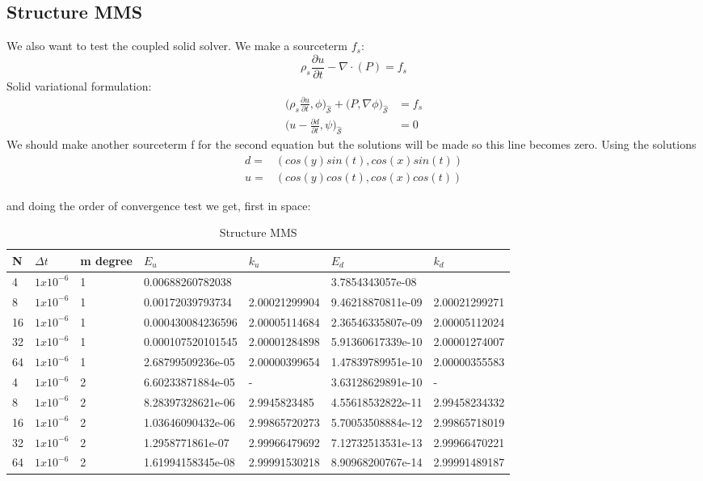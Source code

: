 \subsection{Structure MMS}
We also want to test the coupled solid solver. We make a sourceterm $f_s$:
$$\rho_s \frac{\partial u}{\partial t} - \nabla \cdot ( P ) = f_s $$
Solid variational formulation:
\begin{align}
\big(\rho_s \frac{\partial u}{\partial t},\phi \big)_{\mathcal{\hat{S}}} + \big(P, \nabla \phi \big)_{\mathcal{\hat{S}}} &=f_s \\
\big( u- \frac{\partial d}{\partial t} ,\psi \big)_{\mathcal{\hat{S}}} &= 0 
\end{align}
We should make another sourceterm f for the second equation but the solutions will be made so this line becomes zero.
Using the solutions 
\begin{align*}
d =& ( cos(y)sin(t) , cos(x)sin(t) )\\
u =& ( cos(y)cos(t), cos(x)cos(t) )
\end{align*}



and doing the order of convergence test we get, first in space:

\begin{table}[h!]
\centering
\caption{Structure MMS}
\label{my-label}
\begin{tabular}{|l|l|l|l|l|l|l|}
\hline
N & $\Delta t$ & m degree & $E_u$ & $k_u$ & $E_d$ & $k_d$ \\ \hline
4 & $1x10^{-6}$ & 1 & 0.00688260782038 &  & 3.7854343057e-08 &  \\ \hline
8 & $1x10^{-6}$ & 1 & 0.00172039793734 & 2.00021299904 & 9.46218870811e-09 & 2.00021299271 \\ \hline
16 & $1x10^{-6}$ & 1 & 0.000430084236596 & 2.00005114684 & 2.36546335807e-09 & 2.00005112024 \\ \hline
32 & $1x10^{-6}$ & 1 & 0.000107520101545 & 2.00001284898 & 5.91360617339e-10 & 2.00001274007 \\ \hline
64 & $1x10^{-6}$ & 1 & 2.68799509236e-05 & 2.00000399654 & 1.47839789951e-10 & 2.00000355583 \\ \hline
4 & $1x10^{-6}$ & 2 & 6.60233871884e-05 & - & 3.63128629891e-10 & - \\ \hline
8 & $1x10^{-6}$ & 2 & 8.28397328621e-06 & 2.9945823485 & 4.55618532822e-11 & 2.99458234332 \\ \hline
16 & $1x10^{-6}$ & 2 & 1.03646090432e-06 & 2.99865720273 & 5.70053508884e-12 & 2.99865718019 \\ \hline
32 & $1x10^{-6}$ & 2 & 1.2958771861e-07 & 2.99966479692 & 7.12732513531e-13 & 2.99966470221 \\ \hline
64 & $1x10^{-6}$ & 2 & 1.61994158345e-08 & 2.99991530218 & 8.90968200767e-14 & 2.99991489187 \\ \hline
\end{tabular}
\end{table}

